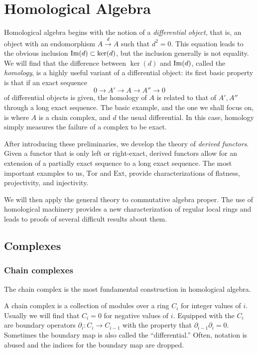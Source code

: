 \chapter{Homological Algebra}


Homological algebra begins with the notion of a \emph{differential object,}
that is, an object with an endomorphism $A \stackrel{d}{\to} A$ such that $d^2 =
0$. This equation leads to the obvious inclusion $\operatorname{Im}(d) \subset \ker(d)$, but
the inclusion generally is not equality. We will find that the difference
between $\ker(d)$ and $\operatorname{Im}(d)$, called the \emph{homology}, is a highly useful
variant of a differential object: its first basic property is that if an exact
sequence
\[ 0 \to A' \to A \to A'' \to 0  \]
of differential objects is given, the homology of $A$ is related to that of
$A', A''$ through a long exact sequence. The basic example, and the one we
shall focus on, is where $A$ is a
chain complex, and $d$ the usual differential.
In this case, homology simply measures the failure of a complex to be exact.

After introducing these preliminaries, we develop the theory of \emph{derived
functors}. Given a functor that is only left or right-exact, derived functors
allow for an extension of a partially exact sequence to a long exact sequence.
The most important examples to us, $\mathrm{Tor}$ and $\mathrm{Ext}$, provide
characterizations of flatness, projectivity, and injectivity.

We will then apply the general theory to commutative algebra proper. The use
of homological machinery provides a new characterization of regular local
rings and leads to proofs of several difficult results about them.

\section{Complexes}


\subsection{Chain complexes}
The chain complex is the most fundamental construction in
homological algebra.

\begin{definition} A chain complex is a collection of modules
over a ring $C_i$
for integer values of $i$. Usually we will find that $C_i=0$ for
negative values of $i$. Equipped with the $C_i$ are boundary
operators
$\partial_i:C_i\rightarrow C_{i-1}$ with the property that
$\partial_{i-1}\partial_i=0$. Sometimes the boundary map is also
called the
``differential.'' Often, notation is abused and the indices for
the boundary map are dropped.\end{definition}


